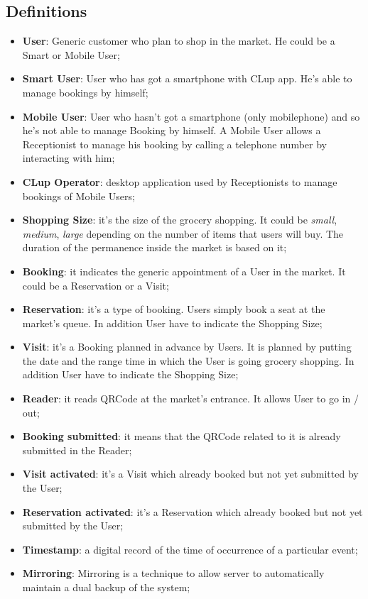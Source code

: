 \subsection{Definitions}
\begin{itemize}
\item \textbf{User}: Generic customer who plan to shop in the market. He could be a Smart or Mobile User;
\item \textbf{Smart User}: User who has got a smartphone with CLup app. He's able to manage bookings by himself;
\item \textbf{Mobile User}: User who hasn't got a smartphone (only mobilephone) and so he's not able to manage Booking by himself. A Mobile User allows a Receptionist to manage his booking by calling a telephone number by interacting with him;
\item \textbf{CLup Operator}: desktop application used by Receptionists to manage bookings of Mobile Users;
\item \textbf{Shopping Size}: it's the size of the grocery shopping. It could be \textit{small}, \textit{medium}, \textit{large} depending on the number of items that users will buy. The duration of the permanence inside the market is based on it; 
\item \textbf{Booking}: it indicates the generic appointment of a User in the market. It could be a Reservation or a Visit;
\item \textbf{Reservation}: it's a type of booking. Users simply book a seat at the market's queue. In addition User have to indicate the Shopping Size; 
\item \textbf{Visit}: it's a Booking planned in advance by Users. It is planned by putting the date and the range time in which the User is going grocery shopping. In addition User have to indicate the Shopping Size; 
\item \textbf{Reader}: it reads QRCode at the market's entrance. It allows User to go in / out;
\item \textbf{Booking submitted}: it means that the QRCode related to it is already submitted in the Reader;
\item \textbf{Visit activated}: it's a Visit which already booked but not yet submitted by the User;
\item \textbf{Reservation activated}: it's a Reservation which already booked but not yet submitted by the User;
\item \textbf{Timestamp}: a digital record of the time of occurrence of a particular event;
\item\textbf{Mirroring}: Mirroring is a technique to allow server to automatically maintain a dual backup of the system;
\end{itemize}

